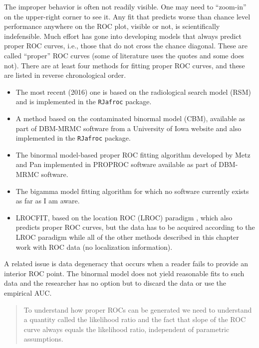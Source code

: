 \documentclass[
]{book}
\begin{document}
The improper behavior is often not readily visible. One may need to ``zoom-in'' on the upper-right corner to see it. Any fit that predicts worse than chance level performance anywhere on the ROC plot, visible or not, is scientifically indefensible. Much effort has gone into developing models that always predict proper ROC curves, i.e., those that do not cross the chance diagonal. These are called ``proper'' ROC curves (some of literature uses the quotes and some does not). There are at least four methods for fitting proper ROC curves, and these are listed in reverse chronological order.

\begin{itemize}
\item
  The most recent (2016) one \citep{chakraborty2011estimating, chakraborty2012inverse} is based on the radiological search model (RSM) and is implemented in the \texttt{RJafroc} package.
\item
  A method \citep{dorfman2000contaminated1, dorfman2000contaminated2, dorfman2000contaminated3} based on the contaminated binormal model (CBM), available as part of DBM-MRMC software from a University of Iowa website and also implemented in the \texttt{RJafroc} package.
\item
  The binormal model-based proper ROC fitting algorithm \citep{metz1999proper, pan1997proper} developed by Metz and Pan implemented in PROPROC software available as part of DBM-MRMC software.
\item
  The bigamma model \citep{dorfman1997proper} fitting algorithm for which no software currently exists as far as I am aware.
\item
  LROCFIT, based on the location ROC (LROC) paradigm \citep{swensson1996unified}, which also predicts proper ROC curves, but the data has to be acquired according to the LROC paradigm while all of the other methods described in this chapter work with ROC data (no localization information).
\end{itemize}

A related issue is data degeneracy that occurs when a reader fails to provide an interior ROC point. The binormal model does not yield reasonable fits to such data and the researcher has no option but to discard the data or use the empirical AUC.

\begin{quote}
To understand how proper ROCs can be generated we need to understand a quantity called the likelihood ratio and the fact that slope of the ROC curve always equals the likelihood ratio, independent of parametric assumptions.
\end{quote}
\end{document}
